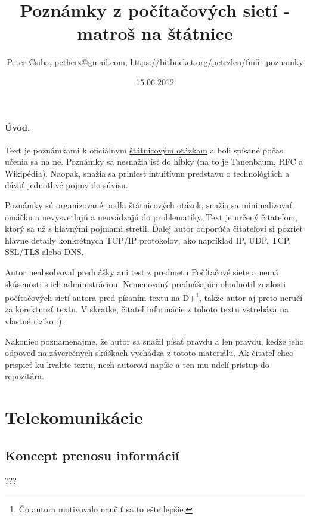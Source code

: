 \documentclass[10pt,a4paper]{article}
\title{Poznámky z počítačových sietí - matroš na štátnice}
\date{15.06.2012}
\author{Peter Csiba, petherz@gmail.com, \url{https://bitbucket.org/petrzlen/fmfi_poznamky}}
\begin{document}
\maketitle
\tableofcontents

\clearpage

\paragraph{Úvod.}   

Text je poznámkami k oficiálnym \href{http://new.dcs.fmph.uniba.sk/index.php/Studium/Bakalarske/StatneSkusky}{štátnicovým otázkam} a boli spísané počas učenia sa na ne.
Poznámky sa nesnažia ísť do hĺbky (na to je Tanenbaum, RFC a Wikipédia). Naopak, snažia sa priniesť intuitívnu predstavu o technológiách a dávať jednotlivé pojmy do súvisu. 

Poznámky sú organizované podľa štátnicových otázok, snažia sa minimalizovať omáčku a nevysvetlujú a neuvádzajú do problematiky. Text je určený čitateľom, ktorý sa už s hlavnými pojmami stretli.
Ďalej autor odporúča čitateľovi si pozrieť hlavne detaily konkrétnych TCP/IP protokolov, ako napríklad IP, UDP, TCP, SSL/TLS alebo DNS. 

Autor neabsolvoval prednášky ani test z predmetu Počítačové siete a nemá skúsenosti s ich administráciou. Nemenovaný prednášajúci ohodnotil znalosti počítačových sietí autora pred písaním textu na D+\footnote{
Čo autora motivovalo naučiť sa to ešte lepšie. 
}, takže autor aj preto neručí za korektnosť textu. V skratke, čitateľ informácie z tohoto textu vstrebáva na vlastné riziko :).

Nakoniec poznamenajme, že autor sa snažil písať pravdu a len pravdu, keďže jeho odpoveď na záverečných skúškach vychádza z tototo materiálu. 
Ak čitateľ chce prispieť ku kvalite textu, nech autorovi napíše a ten mu udelí prístup do repozitára. 

\section{Telekomunikácie}           
\subsection{Koncept prenosu informácií} 
???
\end{document}
